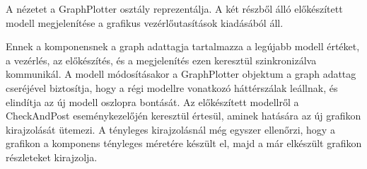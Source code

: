 A nézetet a GraphPlotter osztály reprezentálja.
A két részből álló előkészített modell megjelenítése a grafikus vezérlőutasítások kiadásából áll.

Ennek a komponensnek a graph adattagja tartalmazza a legújabb modell értéket, a vezérlés, az előkészítés, és a megjelenítés ezen keresztül szinkronizálva kommunikál.
A modell módosításakor a GraphPlotter objektum a graph adattag cseréjével biztosítja, hogy a régi modellre vonatkozó háttérszálak leállnak, és elindítja az új modell oszlopra bontását.
Az előkészített modellről a CheckAndPost eseménykezelőjén keresztül értesül, aminek hatására az új grafikon kirajzolását ütemezi.
A tényleges kirajzolásnál még egyszer ellenőrzi, hogy a grafikon a komponens tényleges méretére készült el, majd a már elkészült grafikon részleteket kirajzolja.

